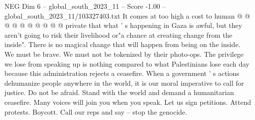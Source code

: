 \begin{textsample}{NEG Dim 6 – global\_south\_2023\_11 – Score -1.00 – global\_south\_2023\_11/103327403.txt}
It comes at too high a cost to human @ @ @ @ @ @ @ @ @ @ private that what ' s happening in Gaza is awful, but they aren't going to risk their livelihood or"a chance at creating change from the inside".
There is no magical change that will happen from being on the inside.
We must be brave.
We must not be tokenized by their photo-ops.
The privilege we lose from speaking up is nothing compared to what Palestinians lose each day because this administration rejects a ceasefire.
When a government ' s actions dehumanize people anywhere in the world, it is our moral imperative to call for justice.
Do not be afraid.
Stand with the world and demand a humanitarian ceasefire.
Many voices will join you when you speak.
Let us sign petitions.
Attend protests.
Boycott.
Call our reps and say -- stop the genocide.

\end{textsample}

